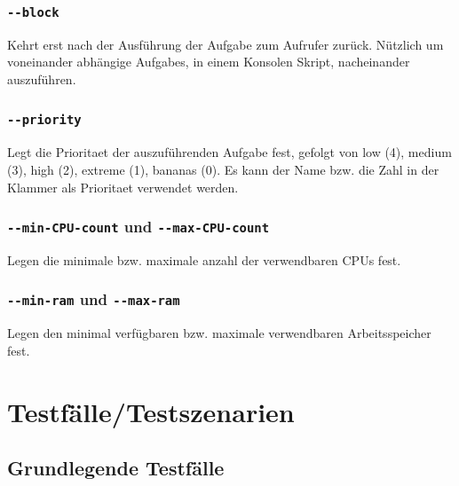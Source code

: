 \documentclass[a4paper,12pt]{article}
\begin{document}
\subsubsection{\texttt{-{}-block}}
Kehrt erst nach der Ausführung der \gls{Aufgabe} zum Aufrufer zurück. Nützlich um voneinander abhängige \glspl{Aufgabe}, in einem Konsolen Skript, nacheinander auszuführen.

\subsubsection{\texttt{-{}-priority}}
Legt die \gls{Prioritaet} der auszuführenden \gls{Aufgabe} fest, gefolgt von low (4), medium (3), high (2), extreme (1), bananas (0).
Es kann der Name bzw. die Zahl in der Klammer als \gls{Prioritaet} verwendet werden.

\subsubsection{\texttt{-{}-min-\gls{CPU}-count} und \texttt{-{}-max-\gls{CPU}-count}}
Legen die minimale bzw. maximale anzahl der verwendbaren \glspl{CPU} fest.

\subsubsection{\texttt{-{}-min-ram} und \texttt{-{}-max-ram}}
Legen den minimal verfügbaren bzw. maximale verwendbaren Arbeitsspeicher fest.

\clearpage
\section{Testfälle/Testszenarien}
\subsection{Grundlegende Testfälle}
\end{document}

